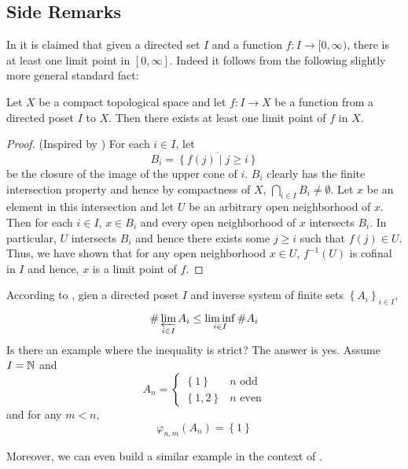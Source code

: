 \documentclass[../main.tex]{subfiles}
\begin{document}
  

\subsection{Side Remarks}
\begin{remark}
  In \cite[p. 60]{Soroker_appendix_2017} it is claimed that given a directed set $I$ and a function $f: I \to [0, \infty)$, there is at least one limit point in $\left[ 0, \infty \right]$.
  Indeed it follows from the following slightly more general standard fact:
\end{remark}
\begin{lemma}
  Let $X$ be a compact topological space and let $f: I \to X$ be a function from a directed poset $I$ to $X$.
  Then there exists at least one limit point of $f$ in $X$. 
\end{lemma}
\begin{proof}
  (Inspired by \cite[Ch. 3 Supplementary Exercisese, question 10]{Munkres_Topology_2014})
  For each $i \in I$, let 
  \[
    B_i = \overline{ \left\{ f\left( j \right) \mid j \geq i \right\} }
  \]
  be the closure of the image of the upper cone of $i$.
  $B_i$ clearly has the finite intersection property and hence by compactness of $X$, $\bigcap_{i \in I} B_i \neq \emptyset$.
  Let $x$ be an element in this intersection and let $U$ be an arbitrary open neighborhood of $x$.
  Then for each $i \in I$, $x \in B_i$ and every open neighborhood of $x$ intersects $B_i$.
  In particular, $U$ intersects $B_i$ and hence there exists some $j \geq i$ such that $f\left( j \right) \in U$.
  Thus, we have shown that for any open neighborhood $x\in U$, $f^{-1}\left( U \right)$ is cofinal in $I$ and hence, $x$ is a limit point of $f$.
\end{proof}
\begin{remark}
  According to \cite[Proposition A.4]{Soroker_appendix_2017}, gien a directed poset $I$ and inverse system of finite sets $\left\{ A_i \right\}_{i \in I}$, 
  \[
    \# \varprojlim_{i \in I} A_i \leq \liminf_{i \in I} \# A_i
  \]
  Is there an example where the inequality is strict?
  The answer is yes.
  Assume $I = \mathbb{N}$ and 
  \[
    A_n = \begin{cases}
      \left\{ 1 \right\} & n \text{ odd} \\
      \left\{ 1, 2 \right\} & n \text{ even}
    \end{cases}
  \]
  and for any $m < n$, 
  \[
    \varphi_{n,m}\left( A_n \right) = \left\{ 1 \right\}
  \]

  Moreover, we can even build a similar example in the context of \cite[Appendix A]{Soroker_appendix_2017}.
\end{remark}
\end{document}
